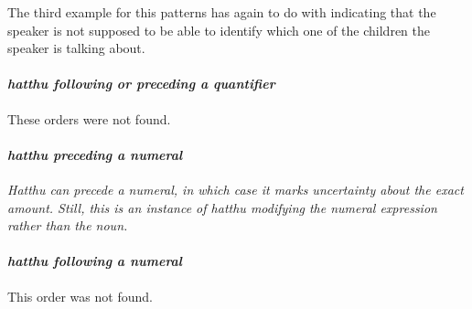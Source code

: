 The third example for this patterns has again to do with indicating that the speaker is not supposed to be able to identify which one of the children the speaker is talking about.


%
%


\paragraph{\em hatthu \em following or preceding a quantifier}
These orders were not found.
\paragraph{\em hatthu \em preceding a numeral}
\em Hatthu \em can precede a numeral, in which case it marks uncertainty about the exact amount. Still, this is an instance of \em hatthu \em modifying the numeral expression rather than the noun.


\paragraph{\em hatthu \em following a numeral}
This order was not found.

